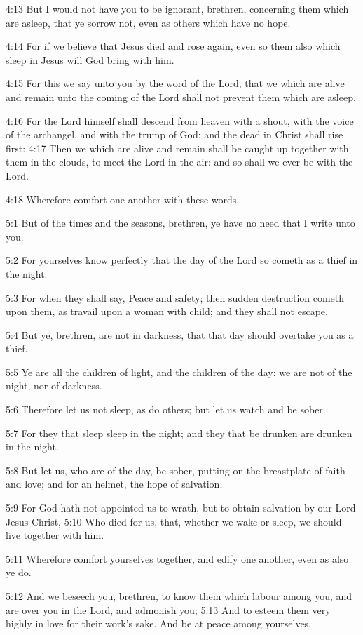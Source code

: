 4:13 But I would not have you to be ignorant, brethren, concerning them which are asleep, that ye sorrow not, even as others which have no hope.

4:14 For if we believe that Jesus died and rose again, even so them also which sleep in Jesus will God bring with him.

4:15 For this we say unto you by the word of the Lord, that we which are alive and remain unto the coming of the Lord shall not prevent them which are asleep.

4:16 For the Lord himself shall descend from heaven with a shout, with the voice of the archangel, and with the trump of God: and the dead in Christ shall rise first: 4:17 Then we which are alive and remain shall be caught up together with them in the clouds, to meet the Lord in the air: and so shall we ever be with the Lord.

4:18 Wherefore comfort one another with these words.

5:1 But of the times and the seasons, brethren, ye have no need that I write unto you.

5:2 For yourselves know perfectly that the day of the Lord so cometh as a thief in the night.

5:3 For when they shall say, Peace and safety; then sudden destruction cometh upon them, as travail upon a woman with child; and they shall not escape.

5:4 But ye, brethren, are not in darkness, that that day should overtake you as a thief.

5:5 Ye are all the children of light, and the children of the day: we are not of the night, nor of darkness.

5:6 Therefore let us not sleep, as do others; but let us watch and be sober.

5:7 For they that sleep sleep in the night; and they that be drunken are drunken in the night.

5:8 But let us, who are of the day, be sober, putting on the breastplate of faith and love; and for an helmet, the hope of salvation.

5:9 For God hath not appointed us to wrath, but to obtain salvation by our Lord Jesus Christ, 5:10 Who died for us, that, whether we wake or sleep, we should live together with him.

5:11 Wherefore comfort yourselves together, and edify one another, even as also ye do.

5:12 And we beseech you, brethren, to know them which labour among you, and are over you in the Lord, and admonish you; 5:13 And to esteem them very highly in love for their work's sake. And be at peace among yourselves.


